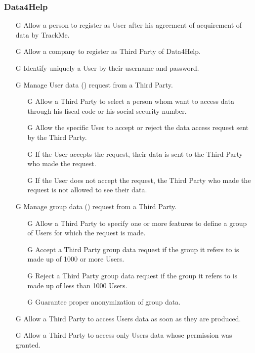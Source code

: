 \documentclass[../../rasd.tex]{subfiles}
\begin{document}
				\subsubsection{Data4Help}
					\begin{itemize}
						\item[G\subs{1}]Allow a person to register as User after his agreement of acquirement of data by TrackMe.
						\item[G\subs{2}]Allow a company to register as Third Party of Data4Help.
						\item[G\subs{3}]Identify uniquely a User by their username and password.

						\item[G\subs{4}]Manage User data () request from a Third Party.
							\begin{itemize}
								\item [G\subs{4.1}]Allow a Third Party to select a person whom want to access data through his fiscal code or his social security number.
								\item [G\subs{4.2}]Allow the specific User to accept or reject the data access request sent by the Third Party.
								\item [G\subs{4.3}]If the User accepts the request, their data is sent to the Third Party who made the request.
								\item [G\subs{4.4}]If the User does not accept the request, the Third Party who made the request is not allowed to see their data.
							\end{itemize}	
						\item [G\subs{5}]Manage group data () request from a Third Party.
							\begin{itemize}
								\item [G\subs{5.1}]Allow a Third Party to specify one or more features to define a group of Users for which the request is made.
								\item [G\subs{5.2}]Accept a Third Party group data request if the group it refers to is made up of 1000 or more Users.
								\item [G\subs{5.3}]Reject a Third Party group data request if the group it refers to is made up of less than 1000 Users.
								\item [G\subs{5.4}]Guarantee proper anonymization of group data.

							\end{itemize}								
						\item[G\subs{6}]Allow a Third Party to access Users data as soon as they are produced.
						\item[G\subs{7}]Allow a Third Party to access only Users data whose permission was granted.
						

\end{itemize}
\end{document}
